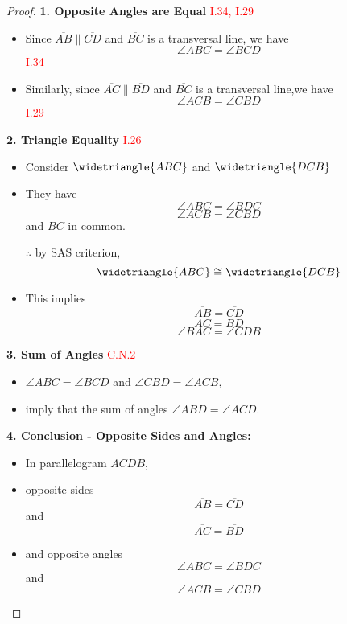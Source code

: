 \begin{proof}

\textbf{1. Opposite Angles are Equal} \hfill\textcolor{red}{ I.34, I.29}
\begin{itemize}
   \item Since $\overline{AB} \parallel \overline{CD}$ and $\overline{BC}$ is a transversal line, we have  
   \[\angle{ABC} = \angle{BCD}\] \hfill\textcolor{red}{I.34}
   
    \item Similarly, since 
    $\overline{AC} \parallel \overline{BD}$ and $\overline{BC}$ is a transversal line,we have 
    \[\angle{ACB} = \angle{CBD}\] \hfill\textcolor{red}{I.29}
\end{itemize}

\textbf{2. Triangle Equality} \hfill\textcolor{red}{ I.26}
\begin{itemize}
    \item Consider $\widetriangle{ABC}$ and $\widetriangle{DCB}$ 
    
    \item They have 
    \[\angle{ABC} = \angle{BDC}\]
    \[ \angle{ACB} = \angle{CBD}\]
    and $\overline{BC}$ in common.
    
    \item[$\therefore$]by SAS criterion,  
    \[\widetriangle{ABC} \cong \widetriangle{DCB}\]
     
    \item This implies  
    \[\overline{AB} = \overline{CD}\]
     \[\overline{AC} = \overline{BD}\]
     \[\angle{BAC} = \angle{CDB}\]
\end{itemize}

\textbf{3. Sum of Angles} \hfill\textcolor{red}{C.N.2}
\begin{itemize}
    \item $\angle{ABC} = \angle{BCD}$ and $\angle{CBD} = \angle{ACB}$, 
    \item imply that the sum of angles $\angle{ABD} = \angle{ACD}$.
\end{itemize}

\textbf{4. Conclusion - Opposite Sides and Angles:}
\begin{itemize}
    \item In parallelogram $ACDB$, 
    \item opposite sides 
    \[\overline{AB} = \overline{CD}\] 
    and 
    \[\overline{AC} = \overline{BD}\]
     
    \item and opposite angles 
    \[\angle{ABC} = \angle{BDC}\] 
    and 
    \[\angle{ACB} = \angle{CBD}\] 
\end{itemize}


\end{proof}
